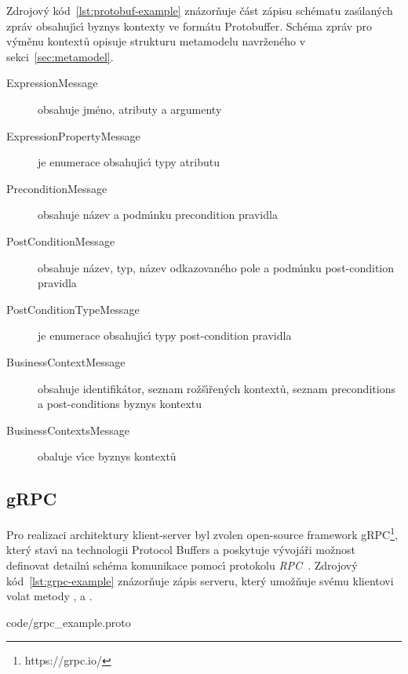 

Zdrojov\'y kód~\ref{lst:protobuf-example} znázorňuje část zápisu schématu
zas\'{\i}lan\'ych zpráv obsahuj\'{\i}c\'{\i} byznys kontexty ve formátu Protobuffer.
Schéma zpráv pro v\'yměnu kontextů opisuje strukturu metamodelu navrženého
v sekci~\ref{sec:metamodel}.

\begin{description}
    \item [ExpressionMessage] obsahuje jméno, atributy a argumenty 
    \item [ExpressionPropertyMessage] je enumerace obsahuj\'{\i}c\'{\i} typy atributu 
    \item [PreconditionMessage] obsahuje název a podm\'{\i}nku precondition pravidla
    \item [PostConditionMessage] obsahuje název, typ, název odkazovaného pole a podm\'{\i}nku post-condition pravidla
    \item [PostConditionTypeMessage] je enumerace obsahuj\'{\i}c\'{\i} typy post-condition pravidla
    \item [BusinessContextMessage] obsahuje identifikátor, seznam rožš\'{\i}řen\'ych kontextů, seznam preconditions a post-conditions byznys kontextu
    \item [BusinessContextsMessage] obaluje v\'{\i}ce byznys kontextů
\end{description}

\subsection{gRPC}

Pro realizaci architektury klient-server byl zvolen
open-source framework gRPC\footnote{https://grpc.io/}, kter\'y stav\'{\i}
na technologii Protocol Buffers a poskytuje v\'yvojáři
možnost definovat detailn\'{\i} schéma komunikace pomoc\'{\i}
protokolu \textit{\gls{RPC}}~\cite{nelson1981remote}.
Zdrojov\'y kód~\ref{lst:grpc-example} znázorňuje zápis serveru,
kter\'y umožňuje svému klientovi volat metody ,
 a .


{code/grpc_example.proto}

